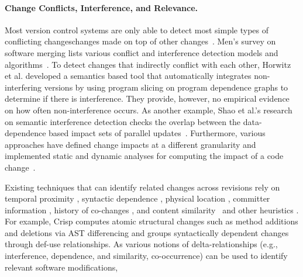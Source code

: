 \documentclass[runningheads,a4paper]{llncs}
\begin{document}
\paragraph{\bf Change Conflicts, Interference, and Relevance. } 
Most version control systems are only able to detect most simple types of conflicting changes\textemdash changes made on top of other changes~\cite{Mens2002}. Men's survey on software merging lists various conflict and interference detection models and algorithms~\cite{Mens2002}. To detect changes that indirectly conflict with each other, Horwitz et al. developed a semantics based tool that automatically integrates non-interfering versions by using program slicing on program dependence graphs to determine if there is interference. They provide, however, no empirical evidence on how often non-interference occurs. As another example, Shao et al.'s research on semantic interference detection checks the overlap between the data-dependence based impact sets of parallel updates~\cite{Shao2007:interference}.  Furthermore, various approaches have defined change impacts at a different granularity and implemented static and dynamic analyses for computing the impact of a code change~\cite{Apiwattanapong2005, Arnold1996:impact, Elbaum2001, Orso2003, Orso2004:impact, Ren2004}.  

Existing techniques that can identify related changes across revisions rely on temporal proximity \cite{Bevan2005, Fischer2003, German2004:softchange, Zimmermann2004b}, syntactic dependence \cite{Chesley2005}, physical location \cite{Zeller1999}, committer information \cite{Fischer2003, German2004:softchange, Zimmermann2004b}, history of co-changes \cite{Gall1998, Ying2004, Zimmermann2004}, and content similarity~\cite{Kim2009, Nguyen2009:clever} and other heuristics \cite{Zeller1999}. For example, Crisp \cite{Chesley2005} computes atomic structural changes such as method additions and deletions via AST differencing and groups syntactically dependent changes through def-use relationships. As various notions of delta-relationships (e.g., interference, dependence, and similarity, co-occurrence) can be used to identify relevant software modifications,  
\end{document}
